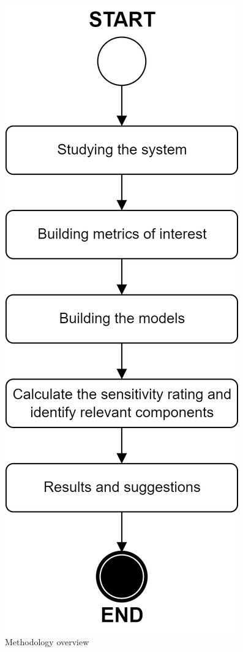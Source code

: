 \documentclass[conference]{IEEEtran}
\begin{document}
\begin{figure}[htbp]
\centerline{\includegraphics[scale=0.9]{img/methodology.png}}
\caption{Methodology overview}
\label{fig:methodology}
\end{figure}
\end{document}
